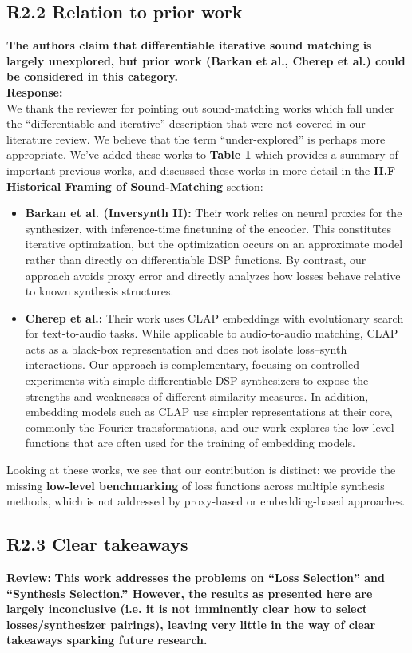 \documentclass[11pt]{article}
\begin{document}
\subsection*{R2.2 Relation to prior work}
\noindent \textbf{The authors claim that differentiable iterative sound matching is largely unexplored, but prior work (Barkan et al., Cherep et al.) could be considered in this category.}\\

\noindent\textbf{Response:} \\
We thank the reviewer for pointing out sound-matching works which fall under the ``differentiable and iterative'' description that were not covered in our literature review. We believe that the term ``under-explored'' is perhaps more appropriate. We've added these works to \textbf{Table 1} which provides a summary of important previous works, and discussed these works in more detail in the \textbf{II.F Historical Framing of Sound-Matching} section: 
\begin{itemize}
  \item \textbf{Barkan et al. (Inversynth II):} Their work relies on neural proxies for the synthesizer, with inference-time finetuning of the encoder. This constitutes iterative optimization, but the optimization occurs on an approximate model rather than directly on differentiable DSP functions. By contrast, our approach avoids proxy error and directly analyzes how losses behave relative to known synthesis structures.  
  \item \textbf{Cherep et al.:} Their work uses CLAP embeddings with evolutionary search for text-to-audio tasks. While applicable to audio-to-audio matching, CLAP acts as a black-box representation and does not isolate loss--synth interactions. Our approach is complementary, focusing on controlled experiments with simple differentiable DSP synthesizers to expose the strengths and weaknesses of different similarity measures.  In addition, embedding models such as CLAP use simpler representations at their core, commonly the Fourier transformations, and our work explores the low level functions that are often used for the training of embedding models.
\end{itemize}
Looking at these works, we see that our contribution is distinct: we provide the missing \textbf{low-level benchmarking} of loss functions across multiple synthesis methods, which is not addressed by proxy-based or embedding-based approaches.

\subsection*{R2.3 Clear takeaways}
\noindent\textbf{Review:}
\textbf{This work addresses the problems on ``Loss Selection'' and ``Synthesis Selection.''  However, the results as presented here are largely inconclusive (i.e. it is not imminently clear how to select losses/synthesizer pairings), leaving very little in the way of clear takeaways sparking future research.\\}
\end{document}
